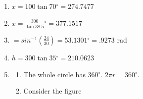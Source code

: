 \documentclass[english]{book}
\newcommand{\degrees}{\ensuremath{^{\circ}}}
\begin{document}
\begin{enumerate}
  \item[\hspace{1cm}43)] $x = 100 \tan 70 \degrees = 274.7477$
  \item[\hspace{1cm}44)] $x = \frac{300}{\tan 38.5} \degrees = 377.1517$
  \item[\hspace{1cm}45)] $= sin^{-1} (\frac{24}{30}) = 53.1301 \degrees = .9273$ rad
  \item[\hspace{1cm}46)] $h = 300 \tan 35 \degrees = 210.0623$
  \item[\hspace{1cm}47)] \begin{enumerate}[\hspace{1cm}a)]
                           \item The whole circle has $360 \degrees$. $2 \pi r = 360 \degrees$.
                           \item Consider the figure
                         \end{enumerate}
\end{enumerate}
\end{document}
